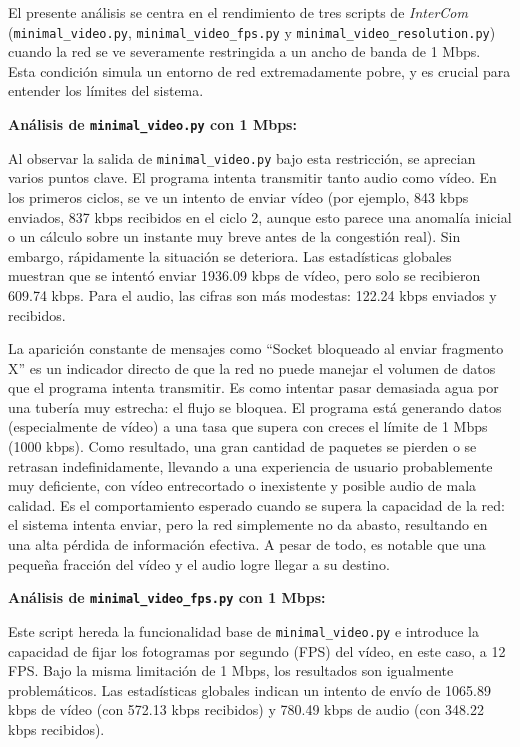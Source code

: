 El presente análisis se centra en el rendimiento de tres scripts de \textit{InterCom} (\texttt{minimal\_video.py}, \texttt{minimal\_video\_fps.py} y \texttt{minimal\_video\_resolution.py}) cuando la red se ve severamente restringida a un ancho de banda de 1 Mbps. Esta condición simula un entorno de red extremadamente pobre, y es crucial para entender los límites del sistema.

\vspace{\baselineskip}

\textbf{Análisis de \texttt{minimal\_video.py} con 1 Mbps:}

Al observar la salida de \texttt{minimal\_video.py} bajo esta restricción, se aprecian varios puntos clave. El programa intenta transmitir tanto audio como vídeo. En los primeros ciclos, se ve un intento de enviar vídeo (por ejemplo, 843 kbps enviados, 837 kbps recibidos en el ciclo 2, aunque esto parece una anomalía inicial o un cálculo sobre un instante muy breve antes de la congestión real). Sin embargo, rápidamente la situación se deteriora. Las estadísticas globales muestran que se intentó enviar 1936.09 kbps de vídeo, pero solo se recibieron 609.74 kbps. Para el audio, las cifras son más modestas: 122.24 kbps enviados y recibidos.

La aparición constante de mensajes como ``Socket bloqueado al enviar fragmento X'' es un indicador directo de que la red no puede manejar el volumen de datos que el programa intenta transmitir. Es como intentar pasar demasiada agua por una tubería muy estrecha: el flujo se bloquea. El programa está generando datos (especialmente de vídeo) a una tasa que supera con creces el límite de 1 Mbps (1000 kbps). Como resultado, una gran cantidad de paquetes se pierden o se retrasan indefinidamente, llevando a una experiencia de usuario probablemente muy deficiente, con vídeo entrecortado o inexistente y posible audio de mala calidad. Es el comportamiento esperado cuando se supera la capacidad de la red: el sistema intenta enviar, pero la red simplemente no da abasto, resultando en una alta pérdida de información efectiva. A pesar de todo, es notable que una pequeña fracción del vídeo y el audio logre llegar a su destino.

\vspace{\baselineskip}

\textbf{Análisis de \texttt{minimal\_video\_fps.py} con 1 Mbps:}

Este script hereda la funcionalidad base de \texttt{minimal\_video.py} e introduce la capacidad de fijar los fotogramas por segundo (FPS) del vídeo, en este caso, a 12 FPS. Bajo la misma limitación de 1 Mbps, los resultados son igualmente problemáticos. Las estadísticas globales indican un intento de envío de 1065.89 kbps de vídeo (con 572.13 kbps recibidos) y 780.49 kbps de audio (con 348.22 kbps recibidos).


